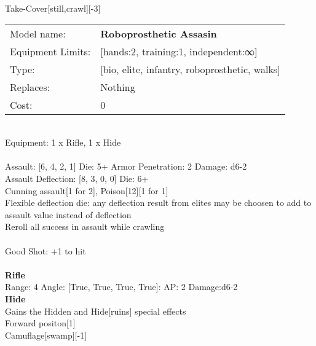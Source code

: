 \noindent Take-Cover[still,crawl][-3]\\ 


\noindent
\begin{tabular}{ll}
Model name: &{\bf Roboprosthetic Assasin } \\
Equipment Limits: &[hands:2, training:1, independent:∞] \\
Type: &[bio, elite, infantry, roboprosthetic, walks] \\
Replaces: &Nothing \\
Cost: & 0\\
\end{tabular}
\ \\
Equipment: 1 x Rifle, 1 x Hide \\
\ \\
Assault: [6, 4, 2, 1] Die: 5+ Armor Penetration: 2 Damage: d6-2 \\
Assault Deflection: [8, 3, 0, 0] Die: 6+\\
\indent Cunning assault[1 for 2], Poison[12][1 for 1]\\ 
Flexible deflection die: any deflection result from elites may be choosen to add to assault value instead of deflection\\ 
Reroll all success in assault while crawling\\ 
 
\ \\
Good Shot: +1 to hit\\ 

\ \\
{\bf Rifle } \\



Range: 4  Angle: [True, True, True, True]: AP: 2 Damage:d6-2 \\




{\bf Hide } \\

Gains the Hidden and Hide[ruins] special effects\\ 
Forward positon[1]\\ 
Camuflage[swamp][-1]\\ 





 
\ \\



